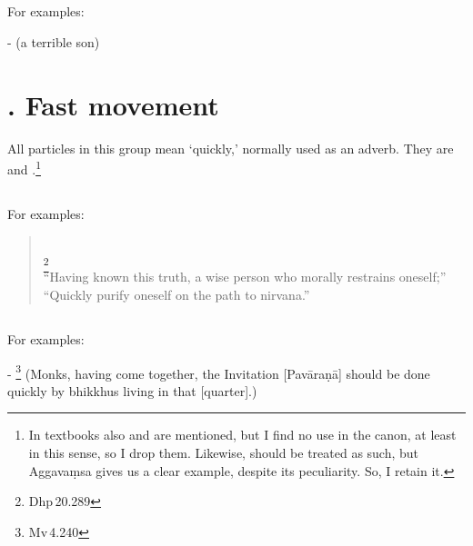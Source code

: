 \subsection*{}\label{nip:ku}
For examples:\par
-  (a terrible son) \par

\label{nipgrp17}
\section*{. Fast movement}

All particles in this group mean `quickly,' normally used as an adverb. They are  and .\footnote{In textbooks also  and  are mentioned, but I find no use in the canon, at least in this sense, so I drop them. Likewise,  should be treated as such, but Aggava\d msa gives us a clear example, despite its peculiarity. So, I retain it.}

\subsection*{}\label{nip:khippadm}
For examples:\par
\begin{quote}
\\
\footnote{Dhp\,20.289}\\[1.5mm]
``Having known this truth, a wise person who morally restrains oneself;''\\
``Quickly purify oneself on the path to nirvana.''\\
\end{quote}

\subsection*{}\label{nip:lahudm}
For examples:\par
- \footnote{Mv\,4.240} (Monks, having come together, the Invitation [Pav\=ara\d n\=a] should be done quickly by bhikkhus living in that [quarter].) \par


